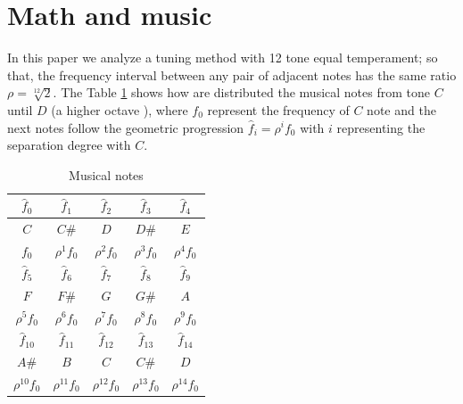 \documentclass[11pt,twocolumn]{article}
\begin{document}
\section{Math and music}
In this paper we analyze a tuning method with 12 tone equal temperament; so that, the frequency interval
between any pair of adjacent notes has the same ratio $\rho = {\sqrt[12]{2}}$.
The Table \ref{tab:notes} shows how are distributed the musical notes from tone $C$ until $D$ (a higher octave ),
where $f_0$ represent the frequency of $C$ note and the next notes
follow the geometric progression $\hat{f}_{i}={\rho}^i f_{0}$ with $i$ representing the separation degree with $C$. 

\begin{table}[h]
\center
{\renewcommand{\arraystretch}{1.2}
\begin{tabular}{|c|c|c|c|c|}
\hline
$\hat{f}_{0}$ & $\hat{f}_{1}$    & $\hat{f}_{2}$    & $\hat{f}_{3}$    & $\hat{f}_{4}$    \\ \hline
$C$           & $C\#$            & $D$              & $D\#$            & $E$              \\ \hline
$f_{0}$       & ${\rho}^1 f_{0}$ & ${\rho}^2 f_{0}$ & ${\rho}^3 f_{0}$ & ${\rho}^4 f_{0}$ \\ \hline
\hline
$\hat{f}_{5}$    & $\hat{f}_{6}$    & $\hat{f}_{7}$    & $\hat{f}_{8}$    & $\hat{f}_{9}$    \\ \hline
$F$              & $F\#$            & $G$              & $G\#$            & $A$              \\ \hline
${\rho}^5 f_{0}$ & ${\rho}^6 f_{0}$ & ${\rho}^7 f_{0}$ & ${\rho}^8 f_{0}$ & ${\rho}^9 f_{0}$ \\ \hline
\hline 
$\hat{f}_{10}$      & $\hat{f}_{11}$      & $\hat{f}_{12}$      & $\hat{f}_{13}$      & $\hat{f}_{14}$      \\ \hline
$A\#$               & $B$                 & $C$                 & $C\#$               & $D$                 \\ \hline
${\rho}^{10} f_{0}$ & ${\rho}^{11} f_{0}$ & ${\rho}^{12} f_{0}$ & ${\rho}^{13} f_{0}$ & ${\rho}^{14} f_{0}$ \\ \hline
\end{tabular}
}
\vspace{5pt}
\caption{Musical notes}
\label{tab:notes}
\end{table}
\end{document}
